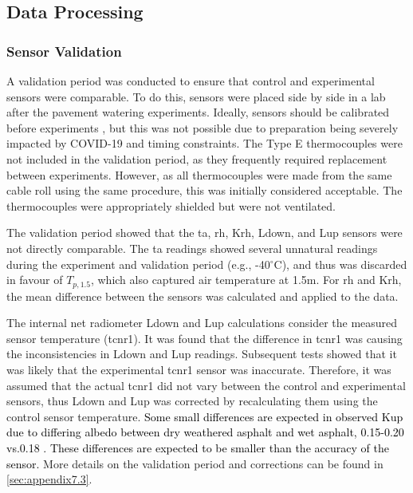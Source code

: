 \documentclass[final,3p,times,authoryear]{elsarticle}
\newcommand{\add}[1]{\textcolor{black}{#1}}
\begin{document}
\subsection{Data Processing}\label{sec:methods2.2}
\subsubsection{Sensor Validation}\label{sec:methods2.2.1}

A validation period was conducted to ensure that control and experimental sensors were comparable. To do this, sensors were placed side by side in a lab after the pavement watering experiments. Ideally, sensors should be calibrated before experiments \citep{Phillips2001}, but this was not possible due to preparation being severely impacted by COVID-19 and timing constraints. The Type E thermocouples were not included in the validation period, as they frequently required replacement between experiments. However, as all thermocouples were made from the same cable roll using the same procedure, this was initially considered acceptable. The thermocouples were appropriately shielded but were not ventilated.

The validation period showed that the \gls{ta}, \gls{rh}, \gls{Krh}, \gls{Ldown}, and \gls{Lup} sensors were not directly comparable. The \gls{ta} readings showed several unnatural readings during the experiment and validation period (e.g., -40$^{\circ}$C), and thus was discarded in favour of $T_{p,1.5}$, which also captured air temperature at 1.5m. For \gls{rh} and \gls{Krh}, the mean difference between the sensors was calculated and applied to the data. 

The internal net radiometer \gls{Ldown} and \gls{Lup} calculations consider the measured sensor temperature (\gls{tcnr1}). It was found that the difference in \gls{tcnr1} was causing the inconsistencies in \gls{Ldown} and \gls{Lup} readings. Subsequent tests showed that it was likely that the experimental \gls{tcnr1} sensor was inaccurate. Therefore, it was assumed that the actual \gls{tcnr1} did not vary between the control and experimental sensors, thus \gls{Ldown} and \gls{Lup} was corrected by recalculating them using the control sensor temperature. \add{Some small differences are expected in observed \gls{Kup} due to differing albedo between dry weathered asphalt and wet asphalt, 0.15-0.20 vs.0.18 \citep{Sandia2024}. These differences are expected to be smaller than the accuracy of the sensor.} More details on the validation period and corrections can be found in \ref{sec:appendix7.3}.
\end{document}
